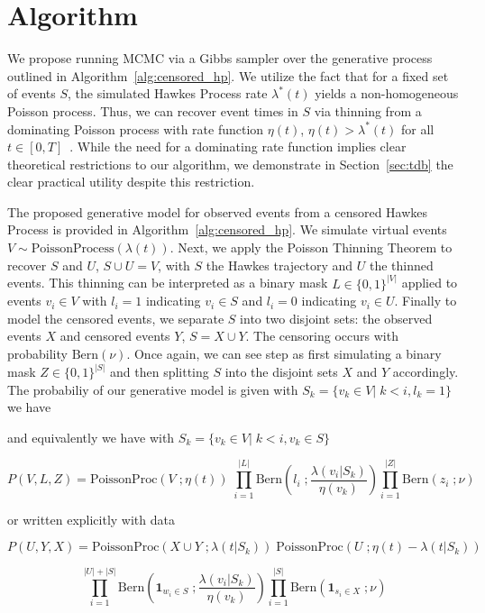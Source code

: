 \documentclass[11pt]{article}
\begin{document}
\section{Algorithm}

We propose running MCMC via a Gibbs sampler over the generative process outlined in Algorithm~\ref{alg:censored_hp}. We utilize the fact that for a fixed set of events $S$, the simulated Hawkes Process rate $\lambda^*(t)$ yields a non-homogeneous Poisson process. Thus, we can recover event times in $S$ via thinning from a dominating Poisson process with rate function $\eta(t)$, $\eta(t) > \lambda^*(t)$ for all $t \in [0,T]$~\cite{pthin}. While the need for a dominating rate function implies clear theoretical restrictions to our algorithm, we demonstrate in Section~\ref{sec:tdb} the clear practical utility despite this restriction.

The proposed generative model for observed events from a censored Hawkes Process is provided in Algorithm~\ref{alg:censored_hp}. We simulate virtual events $V\sim \text{PoissonProcess}(\lambda(t))$. Next, we apply the Poisson Thinning Theorem to recover $S$ and $U$, $S \cup U = V$, with $S$ the Hawkes trajectory and $U$ the thinned events. This thinning can be interpreted as a binary mask $L \in \{0,1\}^{|V|}$ applied to events $v_i \in V$ with $l_i = 1$ indicating $v_i \in S$ and $l_i = 0$ indicating $v_i \in U$. Finally to model the censored events, we separate $S$ into two disjoint sets: the observed events $X$ and censored events $Y$, $S = X \cup Y$. The censoring occurs with probability $\text{Bern}(\nu)$. Once again, we can see step as first simulating a binary mask $Z \in \{0,1\}^{|S|}$ and then splitting $S$ into the disjoint sets $X$ and $Y$ accordingly. The probabiliy of our generative model is given with $S_k = \{v_k \in V|\; k < i, l_k = 1\}$ we have


and equivalently we have with $S_k = \{v_k \in V |\; k < i, v_k \in S\}$



\[
P(V,L,Z)
=
\text{PoissonProc}(V\;;\eta(t))\;
\prod_{i=1}^{|L|} \text{Bern}\left(l_i\;;\frac{\lambda(v_i | S_k)}{\eta(v_k)}\right)
\prod_{i=1}^{|Z|} \text{Bern}(z_i\;;\nu)
\]

\noindent or written explicitly with data

\[
P(U,Y,X)
=
\text{PoissonProc}(X \cup Y\;;\lambda(t|S_k))\;
\text{PoissonProc}(U\;;\eta(t) - \lambda(t|S_k))\;
\]

\[
  \prod_{i=1}^{|U| + |S|} \text{Bern}\left(\mathbf{1}_{w_i \in S}\;;\frac{\lambda(v_i | S_k)}{\eta(v_k)}\right)  
  \prod_{i=1}^{|S|} \text{Bern}(\mathbf{1}_{s_i \in X}\;;\nu)
\]
\end{document}
